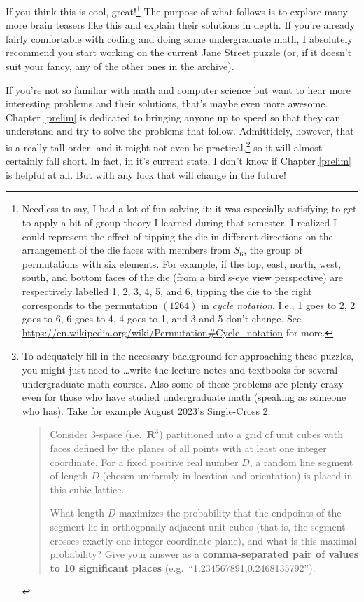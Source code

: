 \documentclass{book}
\begin{document}
If you think this is cool, great!\footnote{Needless to say, I had a lot of fun solving it; it was especially satisfying to get to apply a bit of group theory I learned during that semester. I realized I could represent the effect of tipping the die in different directions on the arrangement of the die faces with members from $S_6$, the group of permutations with six elements. For example, if the top, east, north, west, south, and bottom faces of the die (from a bird's-eye view perspective) are respectively labelled 1, 2, 3, 4, 5, and 6, tipping the die to the right corresponds to the permutation $(1264)$ in \emph{cycle notation}. I.e., 1 goes to 2, 2 goes to 6, 6 goes to 4, 4 goes to 1, and 3 and 5 don't change. See \url{https://en.wikipedia.org/wiki/Permutation\#Cycle_notation} for more.} The purpose of what follows is to explore many more brain teasers like this and explain their solutions in depth. If you're already fairly comfortable with coding and doing some undergraduate math, I absolutely recommend you
start working on the current Jane Street puzzle (or, if it doesn't suit your fancy, any of the other ones in the archive).

If you're not so familiar with math and computer science but want to hear more interesting problems and their solutions, that's maybe even more awesome.
Chapter \ref{prelim} is dedicated to bringing anyone up to speed so that they can understand and try to solve the problems that follow. Admittidely, however, that is a really tall order, and it might not even be practical,\footnote{To adequately fill in the necessary background for approaching these puzzles, you might just need to \dots write the lecture notes and textbooks for several undergraduate math courses. Also some of these problems are plenty crazy even for those who have studied undergraduate math (speaking as someone who has). Take for example August 2023's Single-Cross 2:
\begin{quote}
  Consider 3-space (i.e.\ $\mathbf{R}^3$) partitioned into a grid of unit cubes with faces defined by the planes of all points with at least one integer coordinate. For a fixed positive real number $D$, a random line segment of length $D$ (chosen uniformly in location and orientation) is placed in this cubic lattice.

  What length $D$ maximizes the probability that the endpoints of the segment lie in orthogonally adjacent unit cubes (that is, the segment crosses exactly one integer-coordinate plane), and what is this maximal probability? Give your answer as a \textbf{comma-separated pair of values to 10 significant places} (e.g.\ ``1.234567891,0.2468135792'').
\end{quote}} so it will almost certainly fall short. In fact, in it's current state, I don't know if Chapter \ref{prelim} is helpful at all. But with any luck that will change in the future!
\end{document}
